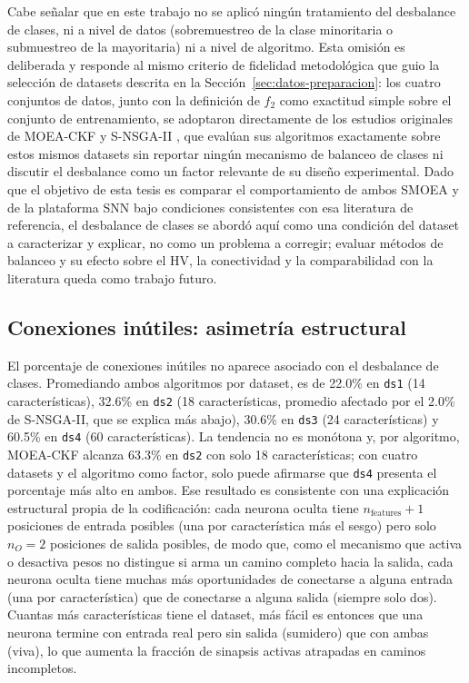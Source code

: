 Cabe señalar que en este trabajo no se aplicó ningún tratamiento del desbalance de clases, ni a nivel de datos (sobremuestreo de la clase minoritaria o submuestreo de la mayoritaria) ni a nivel de algoritmo. Esta omisión es deliberada y responde al mismo criterio de fidelidad metodológica que guio la selección de datasets descrita en la Sección~\ref{sec:datos-preparacion}: los cuatro conjuntos de datos, junto con la definición de $f_2$ como exactitud simple sobre el conjunto de entrenamiento, se adoptaron directamente de los estudios originales de MOEA-CKF y S-NSGA-II \cite{MOEA/CKF, 10066873_S-NSGA-II}, que evalúan sus algoritmos exactamente sobre estos mismos datasets sin reportar ningún mecanismo de balanceo de clases ni discutir el desbalance como un factor relevante de su diseño experimental. Dado que el objetivo de esta tesis es comparar el comportamiento de ambos SMOEA y de la plataforma SNN bajo condiciones consistentes con esa literatura de referencia, el desbalance de clases se abordó aquí como una condición del dataset a caracterizar y explicar, no como un problema a corregir; evaluar métodos de balanceo y su efecto sobre el HV, la conectividad y la comparabilidad con la literatura queda como trabajo futuro.

\subsection{Conexiones inútiles: asimetría estructural}

El porcentaje de conexiones inútiles no aparece asociado con el desbalance de clases. Promediando ambos algoritmos por dataset, es de 22.0\% en \texttt{ds1} (14 características), 32.6\% en \texttt{ds2} (18 características, promedio afectado por el 2.0\% de S-NSGA-II, que se explica más abajo), 30.6\% en \texttt{ds3} (24 características) y 60.5\% en \texttt{ds4} (60 características). La tendencia no es monótona y, por algoritmo, MOEA-CKF alcanza 63.3\% en \texttt{ds2} con solo 18 características; con cuatro datasets y el algoritmo como factor, solo puede afirmarse que \texttt{ds4} presenta el porcentaje más alto en ambos. Ese resultado es consistente con una explicación estructural propia de la codificación: cada neurona oculta tiene $n_{\text{features}}+1$ posiciones de entrada posibles (una por característica más el sesgo) pero solo $n_O=2$ posiciones de salida posibles, de modo que, como el mecanismo que activa o desactiva pesos no distingue si arma un camino completo hacia la salida, cada neurona oculta tiene muchas más oportunidades de conectarse a alguna entrada (una por característica) que de conectarse a alguna salida (siempre solo dos). Cuantas más características tiene el dataset, más fácil es entonces que una neurona termine con entrada real pero sin salida (sumidero) que con ambas (viva), lo que aumenta la fracción de sinapsis activas atrapadas en caminos incompletos.

